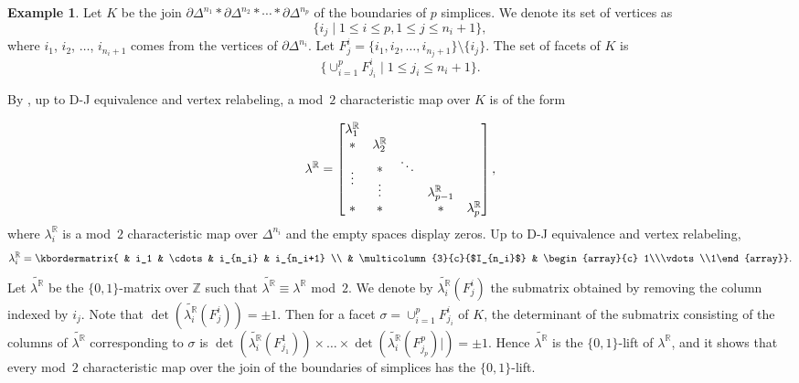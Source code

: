 \documentclass[11pt]{amsart}
\theoremstyle{plain}
\numberwithin{equation}{section}
\theoremstyle{definition}
\newtheorem{example}[theorem]{Example}
\newcommand{\R}{\mathbb{R}}
\newcommand{\Z}{\mathbb{Z}}
\begin{document}
\begin{example} \label{example: general Bott}
    Let $K$ be the join $\partial \Delta^{n_1} * \partial \Delta^{n_2} * \cdots * \partial \Delta^{n_p}$ of the boundaries of $p$ simplices.
    We denote its set of vertices as $$\{i_j \mid 1 \leq i \leq p, 1 \leq j \leq n_i+1 \},$$ where $i_1$, $i_2$, $\ldots$, $i_{n_i+1}$ comes from the vertices of $\partial \Delta^{n_i}$.
    Let $F^i_j = \{i_1, i_2, \ldots, i_{n_j+1}\} \setminus \{i_j\}$.
    The set of facets of $K$ is $$\{\cup_{i=1} ^{p} F^i_{j_i} \mid 1 \leq j_i \leq {n_i+1} \}. $$
    
    By \cite{Choi-Masuda-Suh2010}, up to D-J equivalence and vertex relabeling, a mod~$2$ characteristic map over $K$ is of the form

    $$\lambda^\R = \begin{bmatrix}
                        \lambda_1^\R              &               &        &                    &                  \\
                        \ast                      & \lambda_2^\R  &        &                    &                  \\
                        \multirow{2}{*}{$\vdots$} & \ast          & \ddots &                    &                   \\
                                                  & \vdots        &        & \lambda_{p-1}^\R &                  \\
                        \ast                      & \ast          &        & \ast               & \lambda_{p}^\R \\
                    \end{bmatrix},$$
                     where $\lambda^\R_i$ is a mod~$2$ characteristic map over $\Delta^{n_i}$ and the empty spaces display zeros.
    Up to D-J equivalence and vertex relabeling, $$\lambda^\R_i = \kbordermatrix{ & i_1 & \cdots & i_{n_i} & i_{n_i+1} \\
                    & \multicolumn{3}{c}{$I_{n_i}$} & \begin{array}{c} 1\\\vdots\\1\end{array}}.$$
    Let $\widetilde{\lambda^\R}$ be the $\{0, 1\}$-matrix over $\Z$ such that $\widetilde{\lambda^\R} \equiv \lambda^\R$ mod~$2$. 
    We denote by $\widetilde{\lambda^\R_i}(F^{i}_{j})$ the submatrix obtained by removing the column indexed by $i_j$.
    Note that $\det (\widetilde{\lambda^\R_i}(F^{i}_{j})) = \pm 1$.
    Then for a facet $\sigma = \cup_{i=1} ^{p} F^i_{j_i}$ of $K$, the determinant of the submatrix consisting of the columns of $\widetilde{\lambda^\R}$ corresponding to $\sigma$ is $\det(\widetilde{\lambda^\R_i}(F^{1}_{j_1})) \times \dots \times \det(\widetilde{\lambda^\R_i}(F^{p}_{j_p})|) = \pm 1.$
    Hence $\widetilde{\lambda^\R}$ is the $\{0,1\}$-lift of $\lambda^\R$, and it shows that every mod~$2$ characteristic map over the join of the boundaries of simplices has the $\{0,1\}$-lift.
\end{example}
\end{document}
